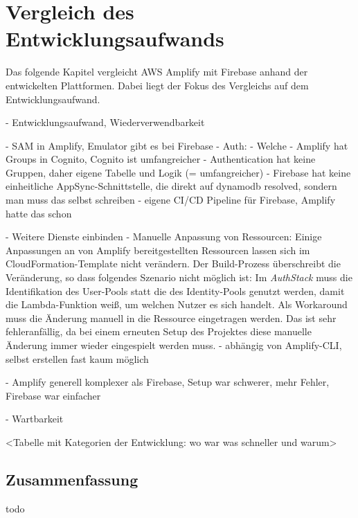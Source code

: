 \chapter{Vergleich des Entwicklungsaufwands}

Das folgende Kapitel vergleicht \ac{AWS} Amplify mit Firebase anhand der entwickelten Plattformen. Dabei liegt der Fokus des Vergleichs auf dem Entwicklungsaufwand.

  - Entwicklungsaufwand, Wiederverwendbarkeit

  - SAM in Amplify, Emulator gibt es bei Firebase
  - Auth:
    - Welche
    - Amplify hat Groups in Cognito, Cognito ist umfangreicher
    - Authentication hat keine Gruppen, daher eigene Tabelle und Logik (= umfangreicher)
  - Firebase hat keine einheitliche AppSync-Schnittstelle, die direkt auf dynamodb resolved, sondern man muss das selbst schreiben
  - eigene CI/CD Pipeline für Firebase, Amplify hatte das schon

  - Weitere Dienste einbinden
    - Manuelle Anpassung von Ressourcen: Einige Anpassungen an von Amplify bereitgestellten Ressourcen lassen sich im CloudFormation-Template nicht verändern. Der Build-Prozess überschreibt die Veränderung, so dass folgendes Szenario nicht möglich ist: Im \textit{AuthStack} muss die Identifikation des User-Pools statt die des Identity-Pools genutzt werden, damit die Lambda-Funktion weiß, um welchen Nutzer es sich handelt. Als Workaround muss die Änderung manuell in die Ressource eingetragen werden. Das ist sehr fehleranfällig, da bei einem erneuten Setup des Projektes diese manuelle Änderung immer wieder eingespielt werden muss.
    - abhängig von Amplify-CLI, selbst erstellen fast kaum möglich

    - Amplify generell komplexer als Firebase, Setup war schwerer, mehr Fehler, Firebase war einfacher

    - Wartbarkeit

    <Tabelle mit Kategorien der Entwicklung: wo war was schneller und warum>

\section{Zusammenfassung}

todo